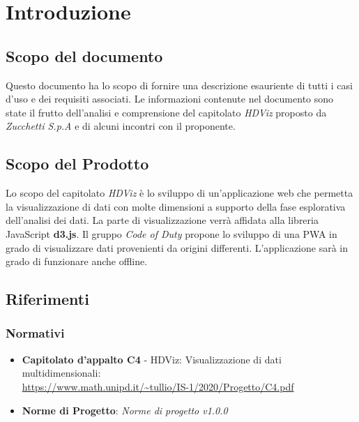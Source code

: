 \section{Introduzione}
    \subsection{Scopo del documento}
    Questo documento ha lo scopo di fornire una descrizione esauriente di tutti i casi d'uso e dei requisiti associati. Le informazioni contenute nel documento sono state il frutto dell'analisi e comprensione del capitolato \emph{HDViz} proposto da \emph{Zucchetti S.p.A} e di alcuni incontri con il proponente.
    \subsection{Scopo del Prodotto}
    Lo scopo del capitolato \emph{HDViz} è lo sviluppo di un'applicazione web che permetta la visualizzazione di dati con molte dimensioni a supporto della fase esplorativa dell'analisi dei dati. La parte di visualizzazione verrà affidata alla libreria JavaScript \textbf{d3.js}. Il gruppo \emph{Code of Duty} propone lo sviluppo di una PWA in grado di visualizzare dati provenienti da origini differenti. L'applicazione sarà in grado di funzionare anche offline.
    \subsection{Riferimenti}
    \subsubsection{Normativi}
    \begin{itemize}
        \item \textbf{Capitolato d'appalto C4} - HDViz: Visualizzazione di dati multidimensionali:\\\url{https://www.math.unipd.it/~tullio/IS-1/2020/Progetto/C4.pdf}
        \item \textbf{Norme di Progetto}: \emph{Norme di progetto v1.0.0}
    \end{itemize}
